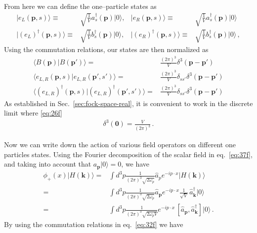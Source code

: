 From here we can define the one--particle states as
\begin{align}
  \label{eq:77f}
   | e_L(\mathbf{p},s)\rangle\equiv&\sqrt{\frac{1}{V}}a^\dagger_s(\mathbf{p})|0\rangle, &    | e_R(\mathbf{p},s)\rangle\equiv&\sqrt{\frac{1}{V}}a^\dagger_s(\mathbf{p})|0\rangle\nonumber\\
   | \left( e_L \right)^{\dagger}(\mathbf{p},s)\rangle\equiv&\sqrt{\frac{1}{V}}{b}^\dagger_s(\mathbf{p})|0\rangle,&
   | \left( e_R \right)^{\dagger}(\mathbf{p},s)\rangle\equiv&\sqrt{\frac{1}{V}}{b}^\dagger_s(\mathbf{p})|0\rangle\,, 
\end{align}
Using the commutation relations, our states are then normalized as
\begin{align}
\langle B(\mathbf{p})| B(\mathbf{p}')\rangle=&\frac{(2\pi)^3}{V}\delta^3(\mathbf{p}-\mathbf{p}')\nonumber\\
\langle e_{L,R}(\mathbf{p},s)| e_{L,R}(\mathbf{p}',s')\rangle=&\frac{(2\pi)^3}{V}\delta_{s s'}\delta^3(\mathbf{p}-\mathbf{p}')\nonumber\\
\langle \left( e_{L,R} \right)^{\dagger}(\mathbf{p},s)| \left( e_{L,R} \right)^{\dagger}(\mathbf{p}',s')\rangle=&\frac{(2\pi)^3}{V}\delta_{s s'}\delta^3(\mathbf{p}-\mathbf{p}')
\end{align}
As established in Sec.~\ref{sec:fock-space-real}, it is convenient to work in the discrete limit where \eqref{eq:26f}
\begin{align}
   \delta^3(\mathbf{0})=\frac{V}{(2\pi)^3}\,.
\end{align}

Now we can write down the action of various field operators on different one particles states. 
Using the Fourier decomposition  of the scalar field in eq.~\eqref{eq:37f}, and taking into account that 
$a_{\mathbf{p}}|0\rangle=0$, we have
\begin{align}
\label{eq:98f}
   \phi_+(x)|H(\mathbf{k})\rangle=&\int d^3p \frac{1}{(2\pi)^3\sqrt{2\omega_{p} }}
\widehat{a}_{p} e^{-i p\cdot x }
|H(\mathbf{k})\rangle\nonumber\\
=&\int d^3p \frac{1}{(2\pi)^3\sqrt{2\omega_{p}}}
\widehat{a}_\mathbf{p} e^{-i p\cdot x }
\frac{1}{\sqrt{V}}\, \widehat{a}^\dagger_{\mathbf{k}}|0\rangle\nonumber\\
  =&\int d^3p \frac{1}{(2\pi)^3\sqrt{2\omega_{p}V}} e^{-i p\cdot x }
\, [\widehat{a}_{\mathbf{p}},\widehat{a}^\dagger_{\mathbf{k}}]|0\rangle\,.
\end{align}
By using the commutation relations in eq.~\eqref{eq:32f} we have

